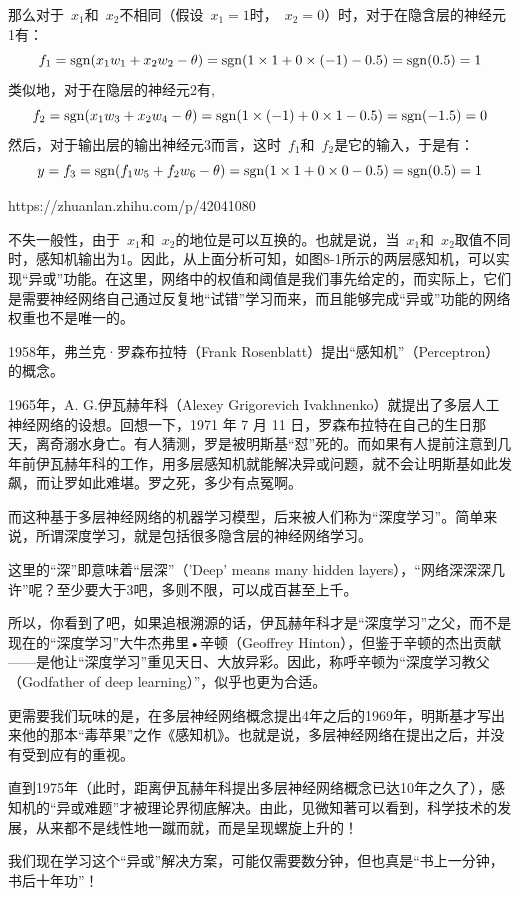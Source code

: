 {那么对于~$x_1$和~$x_2$不相同（假设~$x_1=1$时，~$x_2=0$）时，对于在隐含层的神经元1有：
$$
f_1 ={\rm sgn}(x_1w_1 +x_2 w_2 -\theta) ={\rm sgn}(1\times 1 +0\times (-1)-0.5) ={\rm sgn}(0.5) =1
$$
类似地，对于在隐层的神经元2有,
$$
f_2 ={\rm sgn}(x_1w_3 +x_2 w_4 -\theta) ={\rm sgn}(1\times (-1) +0\times 1-0.5) ={\rm sgn}(-1.5) =0
$$
然后，对于输出层的输出神经元3而言，这时~$f_1$和~$f_2$是它的输入，于是有：
$$
y=f_3 ={\rm sgn}(f_1w_5 +f_2 w_6 -\theta) ={\rm sgn}(1\times 1 +0\times 0-0.5) ={\rm sgn}(0.5) =1
$$



https://zhuanlan.zhihu.com/p/42041080


不失一般性，由于~$x_1$和~$x_2$的地位是可以互换的。也就是说，当~$x_1$和~$x_2$取值不同时，感知机输出为1。因此，从上面分析可知，如图8-1所示的两层感知机，可以实现“异或”功能。在这里，网络中的权值和阈值是我们事先给定的，而实际上，它们是需要神经网络自己通过反复地“试错”学习而来，而且能够完成“异或”功能的网络权重也不是唯一的。


1958年，弗兰克·罗森布拉特（Frank Rosenblatt）提出“感知机”（Perceptron）的概念。

1965年，A. G.伊瓦赫年科（Alexey Grigorevich Ivakhnenko）就提出了多层人工神经网络的设想。回想一下，1971 年 7 月 11 日，罗森布拉特在自己的生日那天，离奇溺水身亡。有人猜测，罗是被明斯基“怼”死的。而如果有人提前注意到几年前伊瓦赫年科的工作，用多层感知机就能解决异或问题，就不会让明斯基如此发飙，而让罗如此难堪。罗之死，多少有点冤啊。

而这种基于多层神经网络的机器学习模型，后来被人们称为“深度学习”。简单来说，所谓深度学习，就是包括很多隐含层的神经网络学习。

这里的“深”即意味着“层深”（’Deep’ means many hidden layers），“网络深深深几许”呢？至少要大于3吧，多则不限，可以成百甚至上千。

所以，你看到了吧，如果追根溯源的话，伊瓦赫年科才是“深度学习”之父，而不是现在的“深度学习”大牛杰弗里•辛顿（Geoffrey Hinton），但鉴于辛顿的杰出贡献——是他让“深度学习”重见天日、大放异彩。因此，称呼辛顿为“深度学习教父（Godfather of deep learning）”，似乎也更为合适。

更需要我们玩味的是，在多层神经网络概念提出4年之后的1969年，明斯基才写出来他的那本“毒苹果”之作《感知机》。也就是说，多层神经网络在提出之后，并没有受到应有的重视。

直到1975年（此时，距离伊瓦赫年科提出多层神经网络概念已达10年之久了），感知机的“异或难题”才被理论界彻底解决。由此，见微知著可以看到，科学技术的发展，从来都不是线性地一蹴而就，而是呈现螺旋上升的！

我们现在学习这个“异或”解决方案，可能仅需要数分钟，但也真是“书上一分钟，书后十年功”！





}
